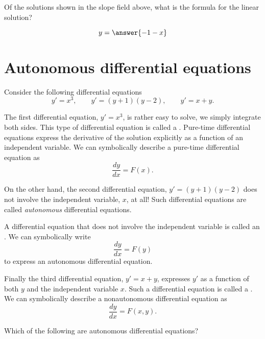 \documentclass{ximera}
\begin{document}
\begin{question}
  Of the solutions shown in the slope field above, what is the formula
  for the linear solution?
  \begin{prompt}
    \[
    y = \answer{-1-x}
    \]
  \end{prompt}
\end{question}



\section{Autonomous differential equations}


Consider the following differential equations
\[
y' = x^3,\qquad y'=(y+1)(y-2), \qquad y'= x+y.
\]

The first differential equation, $y' = x^3$, is rather easy to solve,
we simply integrate both sides. This type of differential equation is
called a . Pure-time differential
equations express the derivative of the solution explicitly as a
function of an independent variable. We can symbolically describe a
pure-time differential equation as
\[
\frac{dy}{dx} = F(x).
\]

On the other hand, the second differential equation, $y'=(y+1)(y-2)$
does not involve the independent variable, $x$, at all!  Such
differential equations are called \textit{autonomous} differential
equations.

\begin{definition}
  A differential equation that does not involve the independent
  variable is called an . We can
  symbolically write
  \[
  \frac{dy}{dx} = F(y)
  \]
  to express an autonomous differential equation.
\end{definition}

Finally the third differential equation, $y'= x+y$, expresses $y'$ as
a function of both $y$ and the independent variable $x$. Such a
differential equation is called a . We can symbolically describe  a nonautonomous differential equation as
\[
\frac{dy}{dx} = F(x,y).
\]
\begin{question}
  Which of the following are autonomous differential equations?
  \begin{selectAll}
  \end{selectAll}
\end{question}
\end{document}
